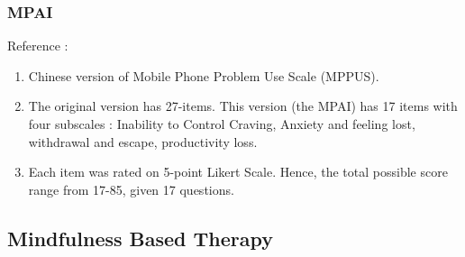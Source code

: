 \documentclass{article}
\begin{document}
\subsubsection{MPAI}
Reference : 
\begin{enumerate}
    \item Chinese version of Mobile Phone Problem Use Scale (MPPUS).
    \item The original version has 27-items. This version (the MPAI) has 17 items with four subscales : Inability to Control Craving, Anxiety and feeling lost, withdrawal and escape, productivity loss.
    \item Each item was rated on 5-point Likert Scale. Hence, the total possible score range from 17-85, given 17 questions.
\end{enumerate}


\subsection{Mindfulness Based Therapy}
\end{document}
